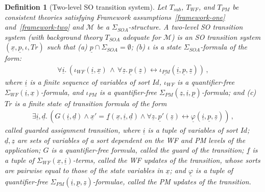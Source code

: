 \documentclass[conference]{IEEEtran}
\newtheorem{definition}{Definition}
\newcommand{\close}{\IEEEQEDclosed}
\begin{document}
\begin{definition}[Two-level SO transition system]
  Let $T_\mathit{sub}$, $T_\mathit{WF}$, and $T_\mathit{PM}$ be consistent
  theories satisfying Framework assumptions~\ref{framework-one} and~\ref{framework-two} 
  and $\mathcal{M}$ be
  a $\Sigma_\mathit{SOA}$-structure.  A \emph{two-level SO
    transition system (with background theory $T_\mathit{SOA}$ 
    adequate for $\mathcal{M}$)} is an SO transition system
  $(\underline{x},\underline{p},\iota,\mathit{Tr})$ such that (a)
  $\underline{p}\cap \Sigma_\mathit{SOA}=\emptyset$; (b) $\iota$ is a state
  $\Sigma_\mathit{SOA}$-formula of the form:
  \begin{eqnarray}
    \label{eq:initial-formula}
    \forall \underline{i}.\,( 
    \iota_{WF}(\underline{i},\underline{x}) \, \wedge \,
    \forall \underline{z}.\,
    \underline{p}(\underline{z}) \leftrightarrow 
    \underline{\iota_{PM}}(\underline{i},\underline{p},\underline{z})) \,,
  \end{eqnarray}
  where $\underline{i}$ is a finite sequence of variables of sort
  $\mathit{Id}$, $\iota_{WF}$ is a quantifier-free
  $\Sigma_{WF}(\underline{i},\underline{x})$-formula, and $\iota_{PM}$
  is a quantifier-free
  $\Sigma_{PM}(\underline{z},\underline{i},\underline{p})$-formula; and (c)
  $\mathit{Tr}$ is a finite state of transition formula of the form
  \begin{eqnarray}
    \label{eq:trans-form}
    \exists \underline{i},\underline{d}.\, (
    G(\underline{i}, \underline{d}) 
    \wedge
    \underline{x}' = \underline{f}(\underline{x}, \underline{i}, \underline{d}) 
    \wedge
    \forall \underline{z}.\, \underline{p}'(\underline{z}) \leftrightarrow
    \underline{\varphi}(\underline{i}, \underline{p}, \underline{z}) )\,,
  \end{eqnarray}
  called \emph{guarded assignment transition}, where $\underline{i}$
  is a tuple of variables of sort $\mathit{Id}$; $\underline{d},
  \underline{z}$ are sets of variables of a sort dependent on the WF
  and PM levels of the application; $G$ is a quantifier-free formula,
  called the \emph{guard} of the transition; $\underline{f}$ is a
  tuple of $\Sigma_\mathit{WF}(\underline{x}, \underline{i})$-terms,
  called the \emph{WF updates} of the transition, whose sorts are
  pairwise equal to those of the state variables in $\underline{x}$;
  and $\underline{\varphi}$ is a tuple of quantifier-free
  $\Sigma_\mathit{PM}(\underline{i}, \underline{p},
  \underline{z})$-formulae, called the \emph{PM updates} of the transition. 
  \hfill\close
\end{definition}
\end{document}
